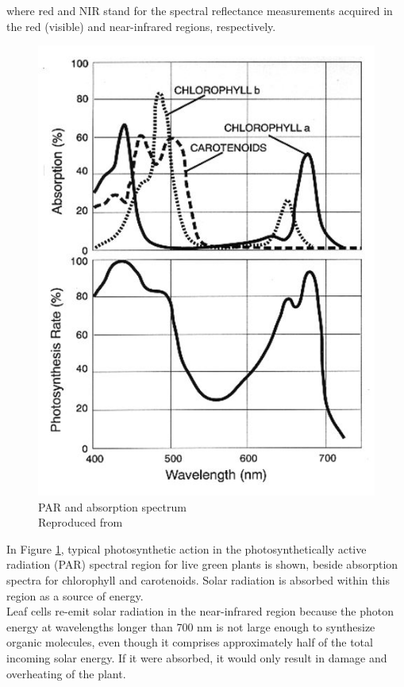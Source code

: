 where red and NIR stand for the spectral reflectance measurements acquired in the red (visible) and near-infrared regions, respectively.

\begin{figure}[H]
\centering
\includegraphics[scale=0.5]{images/chlorophyll.jpg}
\centering
\caption{PAR and absorption spectrum\\
Reproduced from \cite{ndvi_wiki}}
\label{fig:chlorophyll}
\end{figure}

In Figure \ref{fig:chlorophyll}, typical photosynthetic action in the photosynthetically active radiation (PAR) spectral region for live green plants is shown, beside absorption spectra for chlorophyll and carotenoids. Solar radiation is absorbed within this region as a source of energy. \\

Leaf cells re-emit solar radiation in the near-infrared region because the photon energy at wavelengths longer than 700 nm is not large enough to synthesize organic molecules, even though it comprises approximately half of the total incoming solar energy. If it were absorbed, it would only result in damage and overheating of the plant.\\

